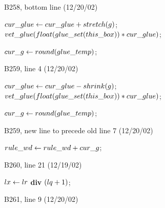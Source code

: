 {{\bugonpage B258, bottom line (12/20/02)

\ninepoint\noindent
\qquad{} $\\{cur\_glue}\gets\\{cur\_glue}+\\{stretch}(g)$;
 $\\{vet\_glue}(\\{float}(\\{glue\_set}(\\{this\_box}))*\\{cur\_glue})$;\par
\noindent\qquad\qquad$\\{cur\_g}\gets\\{round}(\\{glue\_temp})$;

\bugonpage B259, line 4 (12/20/02)

\ninepoint\noindent
\qquad{} $\\{cur\_glue}\gets\\{cur\_glue}-\\{shrink}(g)$;
 $\\{vet\_glue}(\\{float}(\\{glue\_set}(\\{this\_box}))*\\{cur\_glue})$;\par
\noindent\qquad\qquad$\\{cur\_g}\gets\\{round}(\\{glue\_temp})$;

\bugonpage B259, new line to precede old line 7 (12/20/02)

\ninepoint\noindent
\quad$\\{rule\_wd}\gets\\{rule\_wd}+\\{cur\_g}$;

\bugonpage B260, line 21 (12/19/02)

\ninepoint\noindent
{} $\\{lx}\gets\\{lr}$ {\bf div} $(\\{lq}+1)$;

\bugonpage B261, line 9 (12/20/02)

}}
